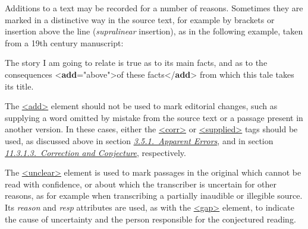 Additions to a text may be recorded for a number of reasons. Sometimes they are marked in a distinctive way in the source text, for example by brackets or insertion above the line (\textit{supralinear} insertion), as in the following example, taken from a 19th century manuscript: \par\bgroup{}\exampleFont \begin{shaded}\noindent\mbox{}The story I am going to relate is true as to its main facts,\mbox{}\newline 
 and as to the consequences {<\textbf{add}\hspace*{1em}{place}="{above}">}of\mbox{}\newline 
 these facts{</\textbf{add}>} from which this tale takes its title.\end{shaded}\egroup\par \par
The \hyperref[TEI.add]{<add>} element should not be used to mark editorial changes, such as supplying a word omitted by mistake from the source text or a passage present in another version. In these cases, either the \hyperref[TEI.corr]{<corr>} or \hyperref[TEI.supplied]{<supplied>} tags should be used, as discussed above in section \textit{\hyperref[COEDCOR]{3.5.1.\ Apparent Errors}}, and in section \textit{\hyperref[PHCC]{11.3.1.3.\ Correction and Conjecture}}, respectively.\par
The \hyperref[TEI.unclear]{<unclear>} element is used to mark passages in the original which cannot be read with confidence, or about which the transcriber is uncertain for other reasons, as for example when transcribing a partially inaudible or illegible source. Its {\itshape reason} and {\itshape resp} attributes are used, as with the \hyperref[TEI.gap]{<gap>} element, to indicate the cause of uncertainty and the person responsible for the conjectured reading.\par

